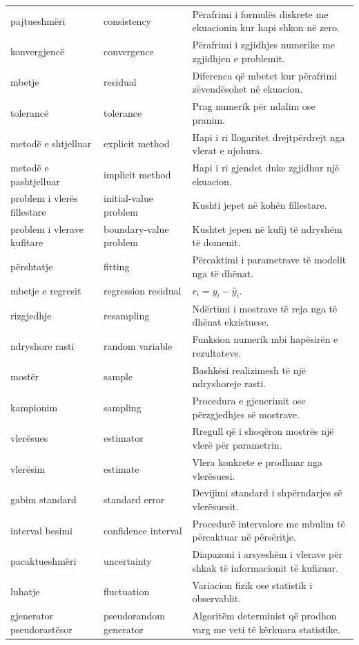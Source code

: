 \begin{longtable}{p{}p{}p{}}
pajtueshmëri & consistency & Përafrimi i formulës diskrete me ekuacionin kur hapi shkon në zero.\\
konvergjencë & convergence & Përafrimi i zgjidhjes numerike me zgjidhjen e problemit.\\
mbetje & residual & Diferenca që mbetet kur përafrimi zëvendësohet në ekuacion.\\
tolerancë & tolerance & Prag numerik për ndalim ose pranim.\\
metodë e shtjelluar & explicit method & Hapi i ri llogaritet drejtpërdrejt nga vlerat e njohura.\\
metodë e pashtjelluar & implicit method & Hapi i ri gjendet duke zgjidhur një ekuacion.\\
problem i vlerës fillestare & initial-value problem & Kushti jepet në kohën fillestare.\\
problem i vlerave kufitare & boundary-value problem & Kushtet jepen në kufij të ndryshëm të domenit.\\
përshtatje & fitting & Përcaktimi i parametrave të modelit nga të dhënat.\\
mbetje e regresit & regression residual & $r_i=y_i-\hat y_i$.\\
rizgjedhje & resampling & Ndërtimi i mostrave të reja nga të dhënat ekzistuese.\\
ndryshore rasti & random variable & Funksion numerik mbi hapësirën e rezultateve.\\
mostër & sample & Bashkësi realizimesh të një ndryshoreje rasti.\\
kampionim & sampling & Procedura e gjenerimit ose përzgjedhjes së mostrave.\\
vlerësues & estimator & Rregull që i shoqëron mostrës një vlerë për parametrin.\\
vlerësim & estimate & Vlera konkrete e prodhuar nga vlerësuesi.\\
gabim standard & standard error & Devijimi standard i shpërndarjes së vlerësuesit.\\
interval besimi & confidence interval & Procedurë intervalore me mbulim të përcaktuar në përsëritje.\\
pacaktueshmëri & uncertainty & Diapazoni i arsyeshëm i vlerave për shkak të informacionit të kufizuar.\\
luhatje & fluctuation & Variacion fizik ose statistik i observablit.\\
gjenerator pseudorastësor & pseudorandom generator & Algoritëm determinist që prodhon varg me veti të kërkuara statistike.\\

\end{longtable}
